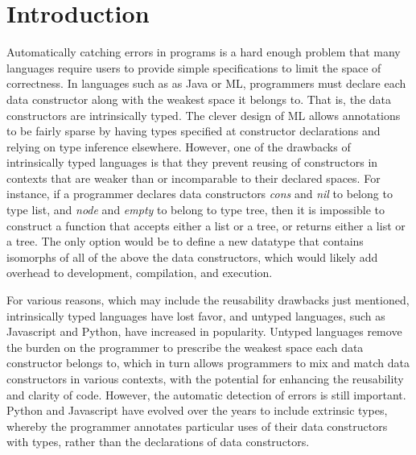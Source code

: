 \documentclass[acmsmall]{acmart}
\theoremstyle{definition}
\begin{document}
\newcommand{\pc}{\hfill \break \noindent \ $\diamond$ \ }


\newcommand{\N}{\ $\cdot$\ \ }

\newcommand{\pitem}{\item[$\diamond$]}

\newcommand{\tl}{\textasciitilde{}}
\newcommand{\typdiff}{\J{\textbackslash}}

\maketitle


\section{Introduction}
\label{sec:introduction}

Automatically catching errors in programs is a hard enough problem
that many languages require users to provide simple specifications to limit the space of correctness.
In languages such as as Java or ML, programmers must declare each data constructor along with the weakest space it belongs to. 
That is, the data constructors are intrinsically typed.
The clever design of ML allows annotations to be fairly sparse by 
having types specified at constructor declarations and relying on type inference elsewhere.
However, one of the drawbacks of intrinsically typed languages is that they prevent reusing of
constructors in contexts that are weaker than or incomparable to their declared spaces. 
For instance, if a programmer declares data constructors \emph{cons} and \emph{nil} to belong to type list,
and \emph{node} and \emph{empty} to belong to type tree, then it is impossible to construct a function
that accepts either a list or a tree, or returns either a list or a tree. The only option would be to define
a new datatype that contains isomorphs of all of the above the data constructors, which would 
likely add overhead to development, compilation, and execution.


For various reasons, which may include the reusability drawbacks just mentioned, 
intrinsically typed languages have lost favor,
and untyped languages, 
such as Javascript and Python, have increased in popularity. 
Untyped languages remove the burden on the programmer to prescribe the weakest space each data constructor belongs to, 
which in turn allows programmers to mix and match data constructors in
various contexts, with the potential for enhancing the reusability and clarity of code.
However, the automatic detection of errors is still important. Python and Javascript have 
evolved over the years to include extrinsic types, whereby the programmer annotates particular uses of
their data constructors with types, rather than the declarations of data constructors.
 
\end{document}
